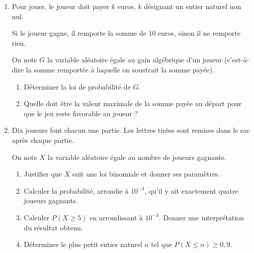 \documentclass[10pt]{article}
\begin{document}
\begin{enumerate}[resume]
\item Pour jouer, le joueur doit payer $k$ euros, $k$ désignant un entier naturel non nul. 

Si le joueur gagne, il remporte la somme de $10$ euros, sinon il ne remporte rien.

On note $G$ la variable aléatoire égale au gain algébrique d'un joueur (c'est-à-dire la somme remportée à laquelle on soustrait la somme payée).
	\begin{enumerate}
		\item Déterminer la loi de probabilité de $G$.
		\item Quelle doit être la valeur maximale de la somme payée au départ pour que le jeu reste
favorable au joueur ?	
	\end{enumerate}
\item Dix joueurs font chacun une partie. Les lettres tirées sont remises dans le sac après chaque partie.

On note $X$ la variable aléatoire égale au nombre de joueurs gagnants.
	\begin{enumerate}
		\item Justifier que $X$ suit une loi binomiale et donner ses paramètres.
		\item Calculer la probabilité, arrondie à $10^{-3}$, qu'il y ait exactement quatre joueurs gagnants. 
		\item Calculer $P(X \geqslant 5)$ en arrondissant à $10^{-3}$. Donner une interprétation du résultat obtenu. 
		\item Déterminer le plus petit entier naturel $n$ tel que $P(X \leqslant n) \geqslant 0,9$.
	\end{enumerate}
\end{enumerate}

\bigskip
\end{document}
